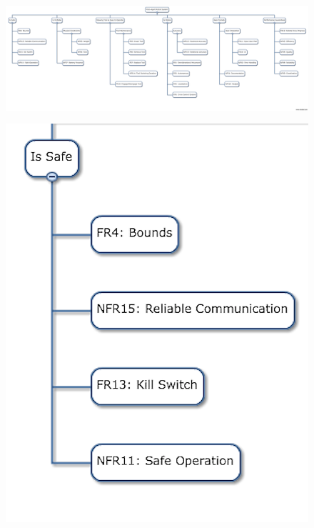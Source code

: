 \begin{figure}[h!]
\centering
\includegraphics[width=0.98\columnwidth]{figs/objectives_tree/objectives_tree_4_2_17.png}
\label{fig:obj_tree_full}
\end{figure}
\begin{figure}[h!]
\centering
\includegraphics[width=0.98\columnwidth]{figs/objectives_tree/objectives_tree_safe.png}
\label{fig:obj_tree_safe}
\end{figure}
